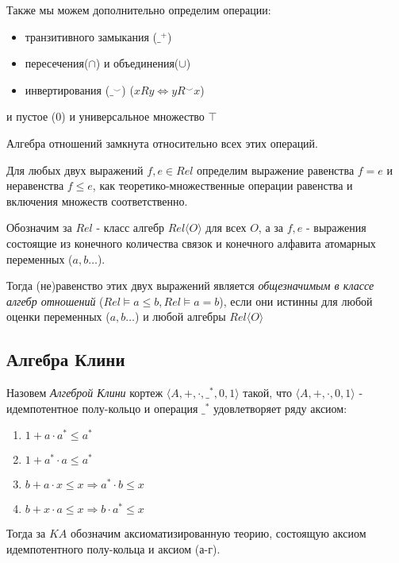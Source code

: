 \documentclass[times
              ]{itmo-student-thesis}
\begin{document}
      Также мы можем дополнительно определим операции:
      \begin{itemize}
        \item транзитивного замыкания ($ \_^{+} $)
        \item пересечения($ \cap $) и объединения($ \cup $)
        \item инвертирования ($ \_^\smile $) ($ x R y \Leftrightarrow y R^\smile x $)
      \end{itemize}
      и пустое ($0$) и универсальное множество $ \top $

      Алгебра отношений замкнута относительно всех этих операций.

      Для любых двух выражений $ f, e \in \mathit{Rel}$ определим выражение равенства $ f = e $ и неравенства $ f \leq e $, как теоретико-множественные операции равенства и включения множеств соответственно.

      Обозначим за $\mathit{Rel}$ - класс алгебр $ \mathit{Rel}\langle O \rangle $ для всех $ O $,
      а за $ f, e $ - выражения состоящие из конечного количества связок и конечного алфавита атомарных переменных ($ a, b \dots $).

      Тогда (не)равенство этих двух выражений является \textit{общезначимым в классе алгебр отношений}
      ($\mathit{Rel} \models a \leq b, \mathit{Rel} \models a = b $), если они истинны для любой оценки переменных ($a, b \dots $) и любой алгебры $ \mathit{Rel}\langle O \rangle $

    \subsection{Алгебра Клини}

      Назовем \textit{Алгеброй Клини} кортеж $\langle A,+,\cdot,\_^*,0,1\rangle$ такой, что $\langle A, +, \cdot, 0, 1 \rangle$ - идемпотентное полу-кольцо и операция $ \_^* $ удовлетворяет ряду аксиом:
      \begin{enumerate}
        \item $ 1 + a \cdot a^* \leq a^* $
        \item $ 1 + a^* \cdot a \leq a^* $
        \item $ b + a \cdot x \leq x \Rightarrow a^* \cdot b \leq x $
        \item $ b + x \cdot a \leq x \Rightarrow b \cdot a^* \leq x $
      \end{enumerate}

      Тогда за $ \mathit{KA} $ обозначим аксиоматизированную теорию, состоящую аксиом идемпотентного полу-кольца и аксиом (а-г).
\end{document}
